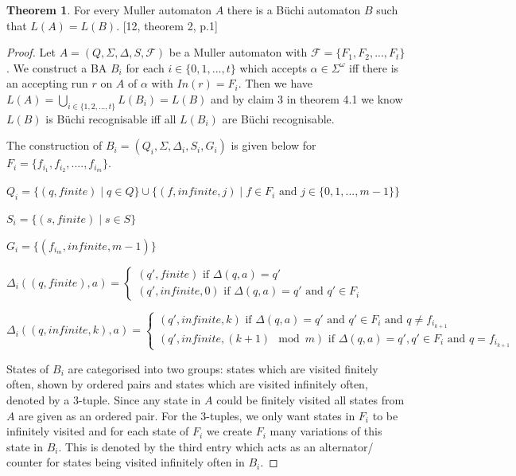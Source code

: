 \documentclass[a4paper,12pt]{report}
\theoremstyle{definition}
\newtheorem{theorem}{Theorem}[chapter]
\begin{document}
\begin{theorem}
\label{ThmMuller->Büchi}
For every Muller automaton $A$ there is a Büchi automaton $B$ such that $L(A)=L(B)$. [12, theorem 2, p.1]
\end{theorem}

\begin{proof}
Let $A=(Q,\Sigma,\Delta,S,\mathcal{F})$ be a Muller automaton with $\mathcal{F}=\{F_1,F_2,...,F_t\}$. We construct a BA $B_i$ for each $i\in\{0,1,...,t\}$ which accepts $\alpha\in\Sigma^\omega$ iff there is an accepting run $r$ on $A$ of $\alpha$ with $In(r)=F_i$. Then we have $L(A)=\bigcup_{i\in\{1,2,...,t\}} L(B_i)=L(B)$ and by claim 3 in theorem 4.1 we know $L(B)$ is Büchi recognisable iff all $L(B_i)$ are Büchi recognisable. 

The construction of $B_i=(Q_i,\Sigma, \Delta_i, S_i, G_i)$ is given below for $F_i=\{f_{i_1},f_{i_2},....,f_{i_m}\}$. 

$Q_i=\{(q, finite) \mid q\in Q \} \cup \{(f, infinite, j) \mid f\in F_i \text{ and } j\in\{0,1,...,m-1\}\}$

$S_i=\{(s, finite)\mid s\in S\}$

$G_i=\{(f_{i_m}, infinite, m-1)\} $

$\Delta_i((q,finite),a)=
\begin{cases}
(q',finite)  \text{ if }\Delta(q,a)=q'\\
(q',infinite,0)  \text{ if } \Delta(q,a)=q' \text{ and } q'\in F_i
\end{cases} $

$\Delta_i((q,infinite,k),a) =
\begin{cases}
(q',infinite,k) \text{ if }\Delta(q,a)=q'\text{ and } q'\in F_i \text{ and } q\neq f_{i_{k+1}}\\
(q',infinite,(k+1)\mod m )  \text{ if }\Delta(q,a)=q', q'\in F_i \text{ and } q=f_{i_{k+1}}
\end{cases}$ 

States of $B_i$ are categorised into two groups: states which are visited finitely often, shown by ordered pairs and states which are visited infinitely often, denoted by a 3-tuple. Since any state in $A$ could be finitely visited all states from $A$ are given as an ordered pair. For the 3-tuples, we only want states in $F_i$ to be infinitely visited and for each state of $F_i$ we create $F_i$ many variations of this state in $B_i$. This is denoted by the third entry which acts as an alternator/ counter for states being visited infinitely often in $B_i$. 


\end{proof}
\end{document}
